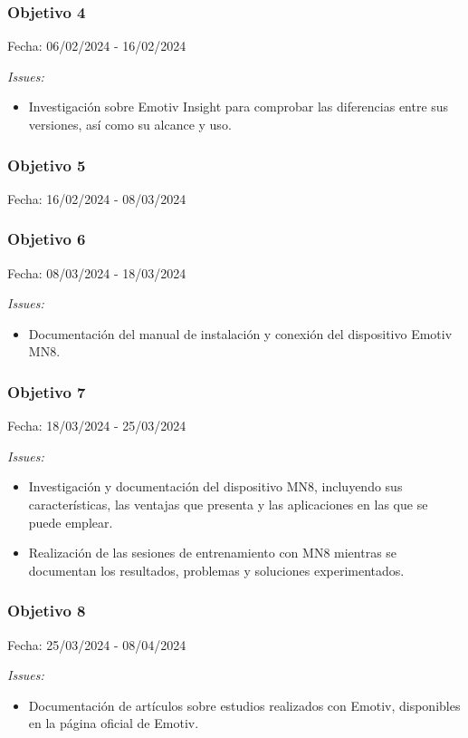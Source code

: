 \subsubsection{Objetivo 4}
Fecha: 06/02/2024 - 16/02/2024

\textit{Issues:}
\begin{itemize}
    \item Investigación sobre Emotiv Insight para comprobar las diferencias entre sus versiones, así como su alcance y uso.
\end{itemize}

\subsubsection{Objetivo 5}
Fecha: 16/02/2024 - 08/03/2024

\subsubsection{Objetivo 6}
Fecha: 08/03/2024 - 18/03/2024

\textit{Issues:}
\begin{itemize}
    \item Documentación del manual de instalación y conexión del dispositivo Emotiv MN8.
\end{itemize}

\subsubsection{Objetivo 7}
Fecha: 18/03/2024 - 25/03/2024

\textit{Issues:}
\begin{itemize}
    \item Investigación y documentación del dispositivo MN8, incluyendo sus características, las ventajas que presenta y las aplicaciones en las que se puede emplear.
    \item Realización de las sesiones de entrenamiento con MN8 mientras se documentan los resultados, problemas y soluciones experimentados.
\end{itemize}

\subsubsection{Objetivo 8}
Fecha: 25/03/2024 - 08/04/2024

\textit{Issues:}
\begin{itemize}
    \item Documentación de artículos sobre estudios realizados con Emotiv, disponibles en la página oficial de Emotiv.
\end{itemize}

